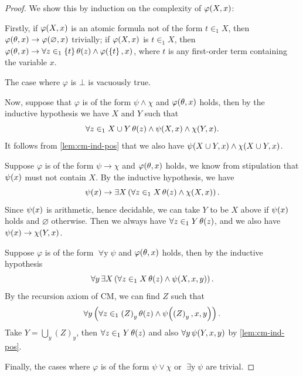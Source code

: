 \documentclass[12pt,openany]{book}
\theoremstyle{plain}
\theoremstyle{definition}
\newcommand\opA[1]{\mathop{\forall #1}}
\newcommand\opE[1]{\mathop{\exists #1}}
\newcommand\CM{\mathrm{CM}}
\begin{document}
\begin{proof}
  We show this by induction on the complexity of $\varphi\mleft(X, x\mright)$:

  Firstly, if $\varphi\mleft(X, x\mright)$ is an atomic formula not of the form $t \in_1 X$, then $\varphi\mleft(\theta, x\mright) \rightarrow \varphi\mleft(\varnothing, x\mright)$ trivially; if $\varphi\mleft(X, x\mright)$ is $t \in_1 X$, then $\varphi\mleft(\theta, x\mright) \rightarrow \opA{z \in_1 \left\{t\right\}} \theta\mleft(z\mright) \land \varphi\mleft(\left\{t\right\}, x\mright)$, where $t$ is any first-order term containing the variable $x$.

  The case where $\varphi$ is $\bot$ is vacuously true.

  Now, suppose that $\varphi$ is of the form $\psi \land \chi$ and $\varphi\mleft(\theta, x\mright)$ holds, then by the inductive hypothesis we have $X$ and $Y$ such that
  \[\opA{z \in_1 X \cup Y} \theta\mleft(z\mright) \land \psi\mleft(X, x\mright) \land \chi\mleft(Y, x\mright).\]
  It follows from \autoref{lem:cm-ind-pos} that we also have $\psi\mleft(X \cup Y, x\mright) \land \chi\mleft(X \cup Y, x\mright)$.

  Suppose $\varphi$ is of the form $\psi \rightarrow \chi$ and $\varphi\mleft(\theta, x\mright)$ holds, we know from stipulation that $\psi\mleft(x\mright)$ must not contain $X$. By the inductive hypothesis, we have
  \[\psi\mleft(x\mright) \rightarrow \opE{X} \left(\opA{z \in_1 X} \theta\mleft(z\mright) \land \chi\mleft(X, x\mright)\right).\] Since $\psi\mleft(x\mright)$ is arithmetic, hence decidable, we can take $Y$ to be $X$ above if $\psi\mleft(x\mright)$ holds and $\varnothing$ otherwise. Then we always have $\opA{z \in_1 Y} \theta\mleft(z\mright)$, and we also have $\psi\mleft(x\mright) \rightarrow \chi\mleft(Y, x\mright)$.

  Suppose $\varphi$ is of the form $\opA{y} \psi$ and $\varphi\mleft(\theta, x\mright)$ holds, then by the inductive hypothesis
  \[\opA{y} \opE{X} \left(\opA{z \in_1 X} \theta\mleft(z\mright) \land \psi\mleft(X, x, y\mright)\right).\]
  By the recursion axiom of $\CM$, we can find $Z$ such that
  \[\opA{y} \left(\opA{z \in_1 \left(Z\right)_y} \theta\mleft(z\mright) \land \psi\mleft(\left(Z\right)_y, x, y\mright)\right).\]
  Take $Y = \bigcup_y \left(Z\right)_y$, then $\opA{z \in_1 Y} \theta\mleft(z\mright)$ and also $\opA{y} \psi\mleft(Y, x, y\mright)$ by \autoref{lem:cm-ind-pos}.

  Finally, the cases where $\varphi$ is of the form $\psi \lor \chi$ or $\opE{y} \psi$ are trivial.
\end{proof}
\end{document}
